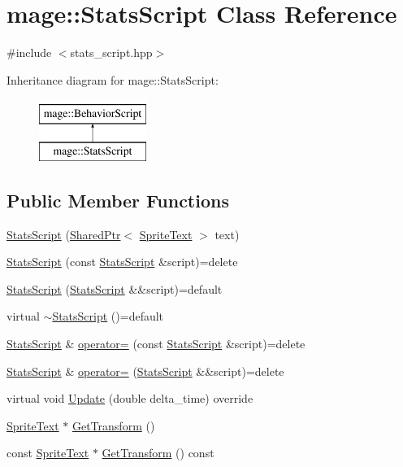 \hypertarget{classmage_1_1_stats_script}{}\section{mage\+:\+:Stats\+Script Class Reference}
\label{classmage_1_1_stats_script}


{\ttfamily \#include $<$stats\+\_\+script.\+hpp$>$}

Inheritance diagram for mage\+:\+:Stats\+Script\+:\begin{figure}[H]
\begin{center}
\leavevmode
\includegraphics[height=2.000000cm]{classmage_1_1_stats_script}
\end{center}
\end{figure}
\subsection*{Public Member Functions}
\begin{DoxyCompactItemize}
\item 
\hyperlink{classmage_1_1_stats_script_a5d2042950a17b62004adead100eb07e1}{Stats\+Script} (\hyperlink{namespacemage_a1e01ae66713838a7a67d30e44c67703e}{Shared\+Ptr}$<$ \hyperlink{classmage_1_1_sprite_text}{Sprite\+Text} $>$ text)
\item 
\hyperlink{classmage_1_1_stats_script_aab237b7c391d7ca7ad96cfa33a3aac81}{Stats\+Script} (const \hyperlink{classmage_1_1_stats_script}{Stats\+Script} \&script)=delete
\item 
\hyperlink{classmage_1_1_stats_script_a1917ed129f6c741f640f0648a378cb3e}{Stats\+Script} (\hyperlink{classmage_1_1_stats_script}{Stats\+Script} \&\&script)=default
\item 
virtual \hyperlink{classmage_1_1_stats_script_a73fa50aa5591220ba5dfa0d2fe4034ab}{$\sim$\+Stats\+Script} ()=default
\item 
\hyperlink{classmage_1_1_stats_script}{Stats\+Script} \& \hyperlink{classmage_1_1_stats_script_a7da39f1c0cc417dabdc539f49deec7c3}{operator=} (const \hyperlink{classmage_1_1_stats_script}{Stats\+Script} \&script)=delete
\item 
\hyperlink{classmage_1_1_stats_script}{Stats\+Script} \& \hyperlink{classmage_1_1_stats_script_a6adacd651debb83254e1121f32c8f21e}{operator=} (\hyperlink{classmage_1_1_stats_script}{Stats\+Script} \&\&script)=delete
\item 
virtual void \hyperlink{classmage_1_1_stats_script_abb2f4de15b51b72e54dc893ecd947fad}{Update} (double delta\+\_\+time) override
\item 
\hyperlink{classmage_1_1_sprite_text}{Sprite\+Text} $\ast$ \hyperlink{classmage_1_1_stats_script_ac3fdf01da2b0ace8afd2c52284c34eef}{Get\+Transform} ()
\item 
const \hyperlink{classmage_1_1_sprite_text}{Sprite\+Text} $\ast$ \hyperlink{classmage_1_1_stats_script_a33bbbe0f85058b706848223a6180da3d}{Get\+Transform} () const
\end{DoxyCompactItemize}
